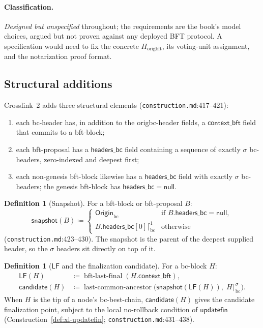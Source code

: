 \documentclass[11pt,a4paper]{article}
\theoremstyle{definition}
\newtheorem{definition}[theorem]{Definition}
\begin{document}
\paragraph{Classification.} \emph{Designed but unspecified} throughout;
the requirements are the book's model choices, argued but not proven
against any deployed BFT protocol. A specification would need to fix the
concrete $\Pi_{\mathrm{origbft}}$, its voting-unit assignment, and the
notarization proof format.

\subsection{Structural additions}\label{sec:xl-structure}

Crosslink~2 adds three structural elements
(\texttt{construction.md}:417--421):
\begin{enumerate}[label=(\arabic*)]
\item each bc-header has, in addition to the origbc-header fields, a
  $\mathsf{context\_bft}$ field that commits to a bft-block;
\item each bft-proposal has a $\mathsf{headers\_bc}$ field containing a
  sequence of exactly $\sigma$ bc-headers, zero-indexed and deepest
  first;
\item each non-genesis bft-block likewise has a $\mathsf{headers\_bc}$
  field with exactly $\sigma$ bc-headers; the genesis bft-block has
  $\mathsf{headers\_bc} = \mathsf{null}$.
\end{enumerate}

\begin{definition}[Snapshot]\label{def:xl-snapshot}
For a bft-block or bft-proposal $B$:
\[
\mathsf{snapshot}(B) \coloneqq
\begin{cases}
\mathsf{Origin}_{\mathrm{bc}} & \text{if } B.\mathsf{headers\_bc} =
  \mathsf{null},\\
B.\mathsf{headers\_bc}[0] \lceil^{1}_{\mathrm{bc}} & \text{otherwise}
\end{cases}
\]
(\texttt{construction.md}:423--430). The snapshot is the parent of the
deepest supplied header, so the $\sigma$ headers sit directly on top of
it.
\end{definition}

\begin{definition}[$\mathsf{LF}$ and the finalization
candidate]\label{def:xl-lf-candidate}
For a bc-block $H$:
\begin{align*}
\mathsf{LF}(H) &\coloneqq
  \operatorname{bft\text{-}last\text{-}final}(H.\mathsf{context\_bft}),\\
\mathsf{candidate}(H) &\coloneqq
  \operatorname{last\text{-}common\text{-}ancestor}\bigl(
    \mathsf{snapshot}(\mathsf{LF}(H)),\; H \lceil^{\sigma}_{\mathrm{bc}}
  \bigr).
\end{align*}
When $H$ is the tip of a node's bc-best-chain, $\mathsf{candidate}(H)$
gives the candidate finalization point, subject to the local no-rollback
condition of $\mathsf{updatefin}$
(Construction~\ref{def:xl-updatefin};
\texttt{construction.md}:431--438).
\end{definition}
\end{document}
